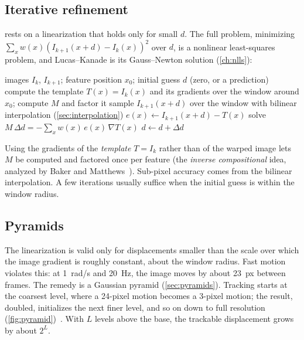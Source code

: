 \subsection{Iterative refinement}

 rests on a linearization that holds only for small $d$. The full problem, minimizing $\sum_xw(x)(I_{k+1}(x + d) - I_k(x))^2$ over $d$, is a nonlinear least-squares
problem, and Lucas--Kanade is its Gauss--Newton solution (\cref{ch:nlls}):

\begin{algorithm}[h]
\caption{Iterative Lucas--Kanade for one feature}
\label{alg:lk}
\begin{algorithmic}[1]
\Require images $I_k$, $I_{k+1}$; feature position $x_0$; initial guess $d$ (zero, or a prediction)
\State compute the template $T(x) = I_k(x)$ and its gradients over the window around $x_0$; compute $M$ and factor it
\Repeat
  \State sample $I_{k+1}(x + d)$ over the window with bilinear interpolation (\cref{sec:interpolation})
  \State $e(x) \gets I_{k+1}(x + d) - T(x)$ 
  \State solve $M\,\Delta d = -\sum_xw(x)\,e(x)\,\nabla T(x)$
  \State $d \gets d + \Delta d$
\end{algorithmic}
\end{algorithm}

Using the gradients of the \emph{template} $T = I_k$ rather than of the warped image lets $M$ be computed and factored once per feature (the \emph{inverse
compositional} idea, analyzed by Baker and Matthews~\cite{baker2004lk}). Sub-pixel accuracy comes from the bilinear interpolation. A few iterations usually
suffice when the initial guess is within the window radius.

\subsection{Pyramids}

The linearization is valid only for displacements smaller than the scale over which the image gradient is roughly constant, about the window radius. Fast motion
violates this: at 1~rad/s and 20~Hz, the image moves by about 23~px between frames. The remedy is a Gaussian pyramid (\cref{sec:pyramids}). Tracking starts at the
coarsest level, where a 24-pixel motion becomes a 3-pixel motion; the result, doubled, initializes the next finer level, and so on down to full resolution
(\cref{fig:pyramid})~\cite{bouguet2001pyramidal}. With $L$ levels above the base, the trackable displacement grows by about $2^L$.

